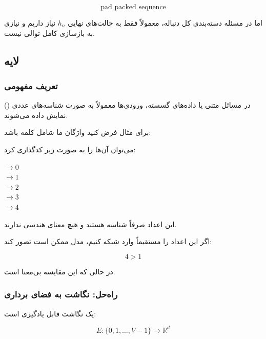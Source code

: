 \documentclass{article}
\begin{document}
\begin{equation}
	\text{pad\_packed\_sequence}
\end{equation}

اما در مسئله دسته‌بندی کل دنباله، معمولاً فقط به حالت‌های نهایی \(h_n\) نیاز داریم و نیازی به بازسازی کامل توالی نیست.

\subsection{لایه }

\subsubsection{تعریف مفهومی}

در مسائل متنی یا داده‌های گسسته، ورودی‌ها معمولاً به صورت شناسه‌های عددی () نمایش داده می‌شوند.

برای مثال فرض کنید واژگان ما شامل  کلمه باشد:

\begin{center}
\end{center}

می‌توان آن‌ها را به صورت زیر کدگذاری کرد:

\begin{center}
	 $\rightarrow 0$ \\
	 $\rightarrow 1$ \\
	 $\rightarrow 2$ \\
	 $\rightarrow 3$ \\
	 $\rightarrow 4$
\end{center}

این اعداد صرفاً شناسه هستند و هیچ معنای هندسی ندارند.

اگر این اعداد را مستقیماً وارد شبکه کنیم، مدل ممکن است تصور کند:

\begin{equation}
	4 > 1
\end{equation}

در حالی که این مقایسه بی‌معنا است.

\subsubsection{راه‌حل: نگاشت به فضای برداری}

 یک نگاشت قابل یادگیری است:

\begin{equation}
	E : \{0, 1, \dots, V-1\} \rightarrow \mathbb{R}^d
\end{equation}
\end{document}
